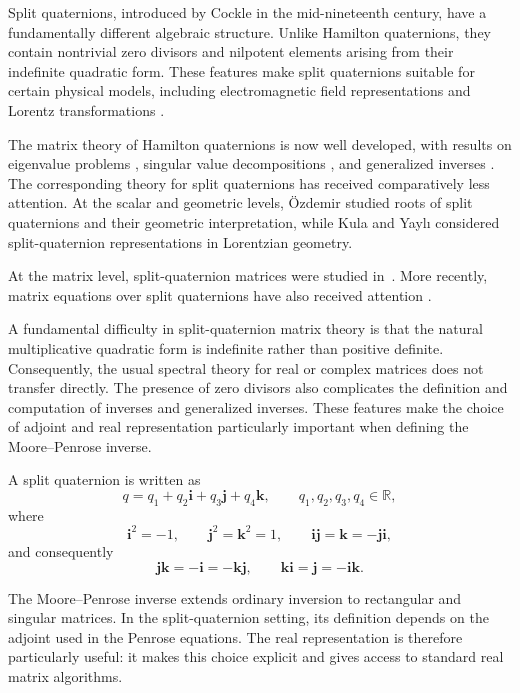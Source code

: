 \documentclass[12pt,a4paper]{article}
\theoremstyle{plain}
\theoremstyle{definition}
\theoremstyle{remark}
\begin{document}
Split quaternions, introduced by Cockle \cite{cockle1849iii} in the
mid-nineteenth century, have a fundamentally different algebraic structure.
Unlike Hamilton quaternions, they contain nontrivial zero divisors and
nilpotent elements arising from their indefinite quadratic form. These
features make split quaternions suitable for certain physical models,
including electromagnetic field representations
\cite{ozdemir2022kinematic} and Lorentz transformations
\cite{antonuccio2015split,ozdemir2014eigenvalues}.

The matrix theory of Hamilton quaternions is now well developed, with
results on eigenvalue problems \cite{wood1985quaternionic,de2000right},
singular value decompositions \cite{le2004singular}, and generalized
inverses \cite{kyrchei2025quaternion}. The corresponding theory for split
quaternions has received comparatively less attention. At the scalar and
geometric levels, \"Ozdemir \cite{ozdemir2009roots} studied roots of split
quaternions and their geometric interpretation, while Kula and Yayl\i{}
\cite{kula2007split} considered split-quaternion representations in
Lorentzian geometry.

At the matrix level, split-quaternion matrices were studied
in~\cite{alagoz2012split}. More recently, matrix equations over split
quaternions have also received attention
\cite{si2024classical,liu2019consistency,gao2024anti}.

A fundamental difficulty in split-quaternion matrix theory is that the
natural multiplicative quadratic form is indefinite rather than positive
definite. Consequently, the usual spectral theory for real or complex
matrices does not transfer directly. The presence of zero divisors also
complicates the definition and computation of inverses and generalized
inverses. These features make the choice of adjoint and real representation
particularly important when defining the Moore--Penrose inverse.

A split quaternion is written as
\[
q=q_1+q_2\mathbf{i}+q_3\mathbf{j}+q_4\mathbf{k},
\qquad
q_1,q_2,q_3,q_4\in\mathbb{R},
\]
where
\[
\mathbf{i}^2=-1,
\qquad
\mathbf{j}^2=\mathbf{k}^2=1,
\qquad
\mathbf{i}\mathbf{j}=\mathbf{k}=-\mathbf{j}\mathbf{i},
\]
and consequently
\[
\mathbf{j}\mathbf{k}=-\mathbf{i}=-\mathbf{k}\mathbf{j},
\qquad
\mathbf{k}\mathbf{i}=\mathbf{j}=-\mathbf{i}\mathbf{k}.
\]

The Moore--Penrose inverse extends ordinary inversion to rectangular and
singular matrices. In the split-quaternion setting, its definition depends
on the adjoint used in the Penrose equations. The real representation is
therefore particularly useful: it makes this choice explicit and gives
access to standard real matrix algorithms.
\end{document}
